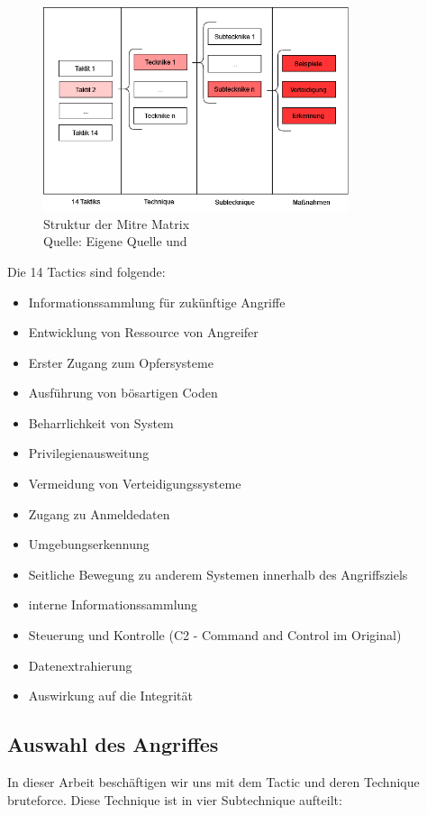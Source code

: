 \begin{figure}[H]
   \centering
   \includegraphics[width=0.8\textwidth]{assets/Mitre_structure.drawio.png}
   \caption{Struktur der Mitre Matrix \\Quelle: Eigene Quelle und \citep{Mitre_Started}}
   \centering
\end{figure}

\newpage
Die 14 Tactics sind folgende:
\begin{itemize}[noitemsep]
   \item Informationssammlung für zukünftige Angriffe 
   \item	Entwicklung von Ressource von Angreifer
   \item Erster Zugang zum Opfersysteme 
   \item Ausführung von bösartigen Coden
   \item Beharrlichkeit von System
   \item	Privilegienausweitung
   \item Vermeidung von Verteidigungssysteme
   \item Zugang zu Anmeldedaten
   \item Umgebungserkennung
   \item Seitliche Bewegung zu anderem Systemen innerhalb des Angriffsziels
   \item interne Informationssammlung
   \item Steuerung und Kontrolle (C2 - Command and Control im Original)
   \item Datenextrahierung 
   \item	Auswirkung auf die Integrität
\end{itemize}


\subsection{Auswahl des Angriffes}
In dieser Arbeit beschäftigen wir uns mit dem Tactic  und deren Technique \gls{bruteforce}. Diese Technique ist in vier Subtechnique aufteilt:

